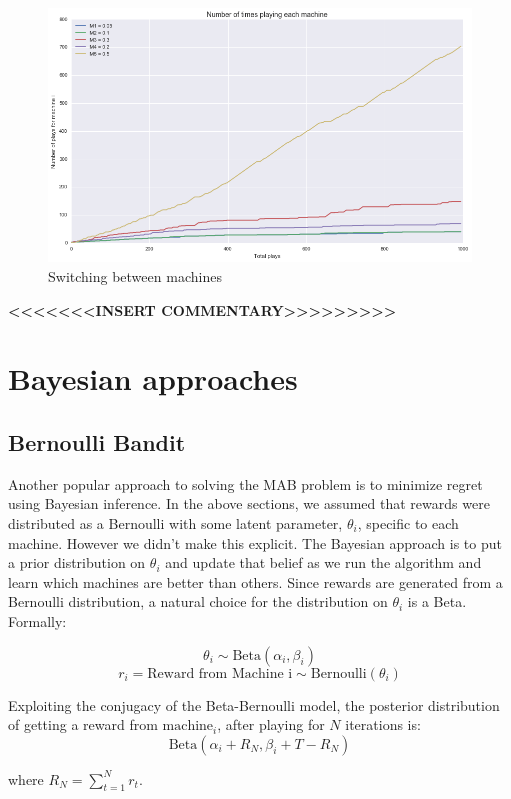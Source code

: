 \documentclass{article}
\begin{document}
\begin{figure}[H]
\centering
\includegraphics[scale=0.5]{UCB_num_plays.png}
\caption{Switching between machines}
\end{figure}

\textbf{<<<<<<<INSERT COMMENTARY>>>>>>>>>}

\section{Bayesian approaches}

\subsection{Bernoulli Bandit}

Another popular approach to solving the MAB problem is to minimize regret using Bayesian inference. In the above sections, we assumed that rewards were distributed as a Bernoulli with some latent parameter, $\theta_i$, specific to each machine. However we didn't make this explicit. The Bayesian approach is to put a prior distribution on $\theta_i$ and update that belief as we run the algorithm and learn which machines are better than others. Since rewards are generated from a Bernoulli distribution, a natural choice for the distribution on $\theta_i$ is a Beta. Formally:

$$\theta_i \sim \text{Beta}(\alpha_i, \beta_i)$$
$$r_i = \text{Reward from Machine i} \sim \text{Bernoulli}(\theta_i)$$

Exploiting the conjugacy of the Beta-Bernoulli model, the posterior distribution of getting a reward from $\text{machine}_i$, after playing for $N$ iterations is:
$$\text{Beta}(\alpha_i + R_{N}, \beta_i + T - R_{N})$$

where $R_{N} = \sum_{t=1}^{N}r_{t}$.\\
\end{document}
